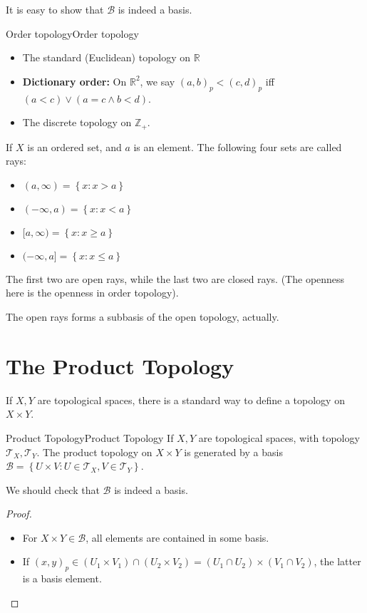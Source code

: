 \documentclass[../main.tex]{subfiles}
\begin{document}
It is easy to show that $\mathcal{B}$ is indeed a basis.

\begin{example}{Order topology}{Order topology}
\begin{itemize}
\item The standard (Euclidean) topology on $\mathbb{R}$
\item \textbf{Dictionary order: } On $\mathbb{R}^2$, we say $(a,b)_p<(c,d)_p$ iff $(a<c) \lor (a=c \land b<d)$.
\item The discrete topology on $\mathbb{Z}_+$.
\end{itemize}
\end{example}

If $X$ is an ordered set, and $a$ is an element. The following four sets are called rays:
\begin{itemize}
	\item $(a, \infty ) = \left\{ x:x>a \right\}$
	\item $(-\infty ,a) = \left\{ x:x<a \right\}$
	\item $[a, \infty ) = \left\{ x:x\geq a \right\}$
	\item $(-\infty ,a] = \left\{ x:x\leq a \right\}$
\end{itemize}
The first two are open rays, while the last two are closed rays. (The openness here is the openness in order topology).

\begin{remark}
The open rays forms a subbasis of the open topology, actually.
\end{remark}


\section{The Product Topology}
If $X,Y$ are topological spaces, there is a standard way to define a topology on $X \times Y$.

\begin{definition}{Product Topology}{Product Topology}
If $X,Y$ are topological spaces, with topology $\mathcal{T}_X,\mathcal{T}_Y$. The product topology on $X \times Y$ is generated by a basis $\mathcal{B} = \left\{ U \times V: U\in \mathcal{T}_X, V\in \mathcal{T}_Y \right\}$.
\end{definition}
We should check that $\mathcal{B}$ is indeed a basis.
\begin{proof}
\begin{itemize}
	\item For $X \times Y\in \mathcal{B}$, all elements are contained in some basis.
	\item If $(x,y)_p \in (U_1 \times V_1)\cap (U_2 \times V_2) = (U_1 \cap U_2) \times (V_1\cap V_2)$, the latter is a basis element.
\end{itemize}
\end{proof}
\end{document}
